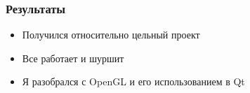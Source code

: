 \begin{frame}\frametitle{Результаты}
    \begin{itemize}
        \item Получился относительно цельный проект
        \item Все работает и шуршит
        \item Я разобрался с OpenGL и его использованием в Qt
    \end{itemize}
\end{frame}
